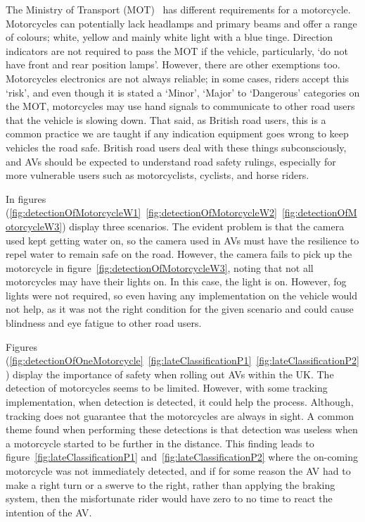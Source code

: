 \documentclass[conference]{IEEEtran}
\begin{document}
		The Ministry of Transport (MOT)~\cite{govuk_mot_nodate} has different requirements for a motorcycle. Motorcycles can potentially lack headlamps and primary beams and offer a range of colours; white, yellow and mainly white light with a blue tinge. Direction indicators are not required to pass the MOT if the vehicle, particularly, `do not have front and rear position lamps'. However, there are other exemptions too. Motorcycles electronics are not always reliable; in some cases, riders accept this `risk', and even though it is stated a `Minor', `Major' to `Dangerous' categories on the MOT, motorcycles may use hand signals to communicate to other road users that the vehicle is slowing down. That said, as British road users, this is a common practice we are taught if any indication equipment goes wrong to keep vehicles the road safe. British road users deal with these things subconsciously, and AVs should be expected to understand road safety rulings, especially for more vulnerable users such as motorcyclists, cyclists, and horse riders.
		
        In figures (\ref{fig:detectionOfMotorcycleW1}~\ref{fig:detectionOfMotorcycleW2}~\ref{fig:detectionOfMotorcycleW3}) display three scenarios. The evident problem is that the camera used kept getting water on, so the camera used in AVs must have the resilience to repel water to remain safe on the road. However, the camera fails to pick up the motorcycle in figure~\ref{fig:detectionOfMotorcycleW3}, noting that not all motorcycles may have their lights on. In this case, the light is on. However, fog lights were not required, so even having any implementation on the vehicle would not help, as it was not the right condition for the given scenario and could cause blindness and eye fatigue to other road users.

		Figures (\ref{fig:detectionOfOneMotorcycle}~\ref{fig:lateClassificationP1}~\ref{fig:lateClassificationP2}) display the importance of safety when rolling out AVs within the UK. The detection of motorcycles seems to be limited. However, with some tracking implementation, when detection is detected, it could help the process. Although, tracking does not guarantee that the motorcycles are always in sight. A common theme found when performing these detections is that detection was useless when a motorcycle started to be further in the distance. This finding leads to figure~\ref{fig:lateClassificationP1} and~\ref{fig:lateClassificationP2} where the on-coming motorcycle was not immediately detected, and if for some reason the AV had to make a right turn or a swerve to the right, rather than applying the braking system, then the misfortunate rider would have zero to no time to react the intention of the AV.
\end{document}
